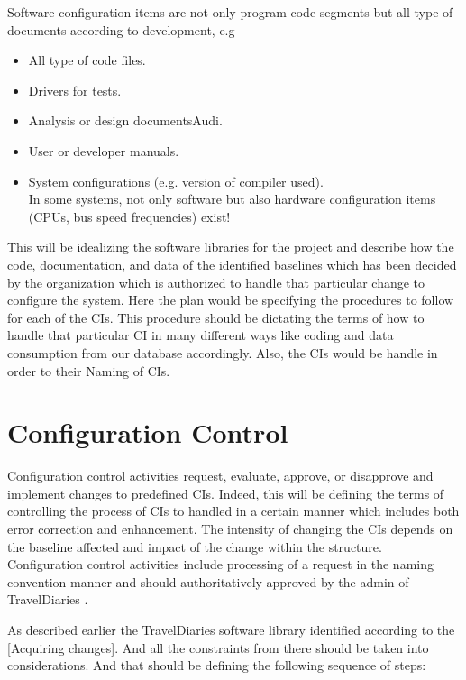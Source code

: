\documentclass[]{article}
\begin{document}
Software configuration items are not only program code segments but all
type of documents according to development, e.g\\

\begin{itemize}

\item All type of code files.
\item Drivers for tests.
\item  Analysis or design documentsAudi.
\item User or developer manuals.
\item System configurations (e.g. version of compiler used).\\

In some systems, not only software but also hardware configuration items
(CPUs, bus speed frequencies) exist!

\end{itemize}
This will be idealizing the software libraries for the project and describe how the code, documentation, and data of the identified baselines which has been decided by the organization which is authorized to handle that particular change to configure the system. Here the plan would be specifying the procedures to follow for each of the CIs. This procedure should be dictating the terms of how to handle that particular CI in many different ways like coding and data consumption from our database accordingly. Also, the CIs would be handle in order to their Naming of CIs.
\section{Configuration Control}
Configuration control activities request, evaluate, approve, or disapprove and implement changes to predefined CIs. Indeed, this will be defining the terms of controlling the process of CIs to handled in a certain manner which includes both error correction and enhancement. The intensity of changing the CIs depends on the baseline affected and impact of the change within the structure. Configuration control activities include processing of a request in the naming convention manner and should authoritatively approved by the admin of TravelDiaries .


As described earlier the TravelDiaries software library identified according to the [Acquiring changes]. And all the constraints from there should be taken into considerations. And that should be defining the following sequence of steps:
\end{document}
